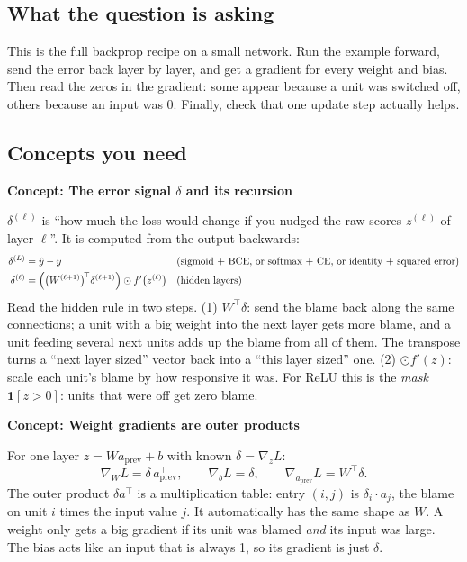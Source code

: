 \documentclass[12pt,a4paper]{article}
\newcommand{\concept}[2]{\par\medskip\phantomsection\label{#1}{\large\bfseries\color{blue!50!black} Concept: #2}\par}
\begin{document}
\subsection*{What the question is asking}
This is the full backprop recipe on a small network. Run the example forward, send the error back layer by layer, and get a gradient for every weight and bias. Then read the zeros in the gradient: some appear because a unit was switched off, others because an input was 0. Finally, check that one update step actually helps.

\subsection*{Concepts you need}

\concept{c:delta}{The error signal $\delta$ and its recursion}
$\delta^{(\ell)}$ is ``how much the loss would change if you nudged the raw scores $z^{(\ell)}$ of layer $\ell$''. It is computed from the output backwards:
\begin{align*}
\delta^{(L)}&=\hat y-y &&\text{(sigmoid + BCE, or softmax + CE, or identity + squared error)}\\
\delta^{(\ell)}&=\Bigl(\bigl(W^{(\ell+1)}\bigr)^{\!\top}\delta^{(\ell+1)}\Bigr)\odot f'\bigl(z^{(\ell)}\bigr) &&\text{(hidden layers)}
\end{align*}
Read the hidden rule in two steps. (1) $W^\top\delta$: send the blame back along the same connections; a unit with a big weight into the next layer gets more blame, and a unit feeding several next units adds up the blame from all of them. The transpose turns a ``next layer sized'' vector back into a ``this layer sized'' one. (2) $\odot f'(z)$: scale each unit's blame by how responsive it was. For ReLU this is the \emph{mask} $\mathbf 1[z>0]$: units that were off get zero blame.

\concept{c:outer}{Weight gradients are outer products}
For one layer $z=Wa_{\text{prev}}+b$ with known $\delta=\nabla_zL$:
\[
\nabla_WL=\delta\,a_{\text{prev}}^\top,\qquad \nabla_bL=\delta,\qquad \nabla_{a_{\text{prev}}}L=W^\top\delta .
\]
The outer product $\delta a^\top$ is a multiplication table: entry $(i,j)$ is $\delta_i\cdot a_j$, the blame on unit $i$ times the input value $j$. It automatically has the same shape as $W$. A weight only gets a big gradient if its unit was blamed \emph{and} its input was large. The bias acts like an input that is always 1, so its gradient is just $\delta$.
\end{document}
